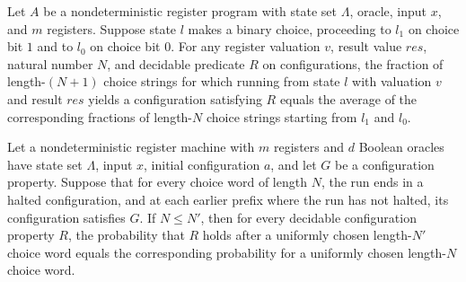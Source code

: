 \begin{lemma}
\label{Complexity.LogProg.randProb_narun_choose}
\leanok
{}
Let $A$ be a nondeterministic register program with state set $\Lambda$, oracle, input
$x$, and $m$ registers. Suppose state $l$ makes a binary choice, proceeding to $l_1$ on
choice bit $1$ and to $l_0$ on choice bit $0$. For any register valuation $v$, result
value $res$, natural number $N$, and decidable predicate $R$ on configurations, the
fraction of length-$(N+1)$ choice strings for which running from state $l$ with
valuation $v$ and result $res$ yields a configuration satisfying $R$ equals the average
of the corresponding fractions of length-$N$ choice strings starting from $l_1$ and
$l_0$.
\end{lemma}

\begin{lemma}
\label{Complexity.LogProg.randProb_narun_mono_len}
\leanok
{}
Let a nondeterministic register machine with $m$ registers and $d$ Boolean oracles have
state set $\Lambda$, input $x$, initial configuration $a$, and let $G$ be a
configuration property. Suppose that for every choice word of length $N$, the run ends
in a halted configuration, and at each earlier prefix where the run has not halted, its
configuration satisfies $G$. If $N\le N'$, then for every decidable configuration
property $R$, the probability that $R$ holds after a uniformly chosen length-$N'$ choice
word equals the corresponding probability for a uniformly chosen length-$N$ choice word.
\end{lemma}

